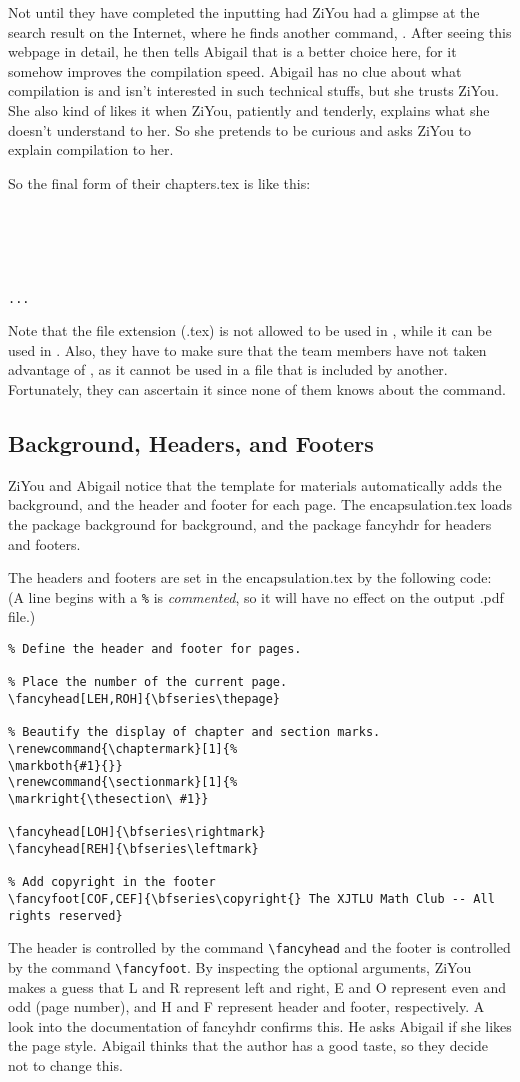 Not until they have completed the inputting had ZiYou had a glimpse at the search result on the Internet, where he finds another command, \verb==. After seeing this webpage in detail, he then tells Abigail that \verb== is a better choice here, for it somehow improves the compilation speed. Abigail has no clue about what compilation is and isn't interested in such technical stuffs, but she trusts ZiYou. She also kind of likes it when ZiYou, patiently and tenderly, explains what she doesn't understand to her. So she pretends to be curious and asks ZiYou to explain compilation to her.

So the final form of their chapters.tex is like this:
\begin{lstlisting}





...
\end{lstlisting}
Note that the file extension (.tex) is not allowed to be used in \verb==, while it can be used in \verb==. Also, they have to make sure that the team members have not taken advantage of \verb==, as it cannot be used in a file that is included by another. Fortunately, they can ascertain it since none of them knows about the command.

\subsection{Background, Headers, and Footers}
ZiYou and Abigail notice that the template for materials automatically adds the background, and the header and footer for each page. The encapsulation.tex loads the package background for background, and the package fancyhdr for headers and footers.

The headers and footers are set in the encapsulation.tex by the following code: (A line begins with a \verb=%= is \emph{commented}, so it will have no effect on the output .pdf file.)
\begin{lstlisting}
% Define the header and footer for pages.

% Place the number of the current page.
\fancyhead[LEH,ROH]{\bfseries\thepage}

% Beautify the display of chapter and section marks.
\renewcommand{\chaptermark}[1]{%
\markboth{#1}{}}
\renewcommand{\sectionmark}[1]{%
\markright{\thesection\ #1}}

\fancyhead[LOH]{\bfseries\rightmark}
\fancyhead[REH]{\bfseries\leftmark}

% Add copyright in the footer
\fancyfoot[COF,CEF]{\bfseries\copyright{} The XJTLU Math Club -- All rights reserved}
\end{lstlisting}
The header is controlled by the command \verb=\fancyhead= and the footer is controlled by the command \verb=\fancyfoot=. By inspecting the optional arguments, ZiYou makes a guess that L and R represent left and right, E and O represent even and odd (page number), and H and F represent header and footer, respectively. A look into the documentation of fancyhdr confirms this. He asks Abigail if she likes the page style. Abigail thinks that the author has a good taste, so they decide not to change this.

